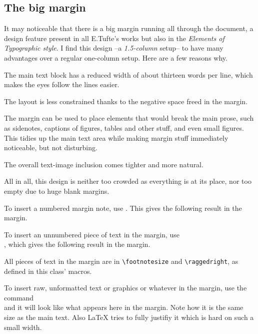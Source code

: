 \documentclass[raggedright, twoside, 11pt]{tufte-style-article}
\begin{document}
\subsection{The big margin}

It may noticeable that there is a big margin running all through the document, a design feature present in all E.Tufte's works but also in the \textit{Elements of Typographic style}. I find this design --a \textit{1.5-column} setup-- to have many advantages over a regular one-column setup. Here are a few reasons why.
\begin{ul}
	\tightlist
	\item The main text block has a reduced width of about thirteen words per line, which makes the eyes follow the lines easier.
	
	\item The layout is less constrained thanks to the negative space freed in the margin.
	
	\item The margin can be used to place elements that would break the main prose, such as sidenotes, captions of figures, tables and other stuff, and even small figures. This tidies up the main text area while making margin stuff immediately noticeable, but not disturbing.
	
	\item The overall text-image inclusion comes tighter and more natural.
\end{ul}
All in all, this design is neither too crowded as everything is at its place, nor too empty due to huge blank margins.

To insert a numbered margin note, use . This gives the following result in the margin.

To insert an unnumbered piece of text in the margin, use\\\noindent{}, which gives the following result in the margin.

All pieces of text in the margin are in \texttt{\textbackslash footnotesize} and \texttt{\textbackslash raggedright}, as defined in this class' macros.

To insert raw, unformatted text or graphics or whatever in the margin, use the command\\  and it will look like what appears here in the margin. Note how it is the same size as the main text. Also \LaTeX{} tries to fully justifiy it which is hard on such a small width.
\end{document}
